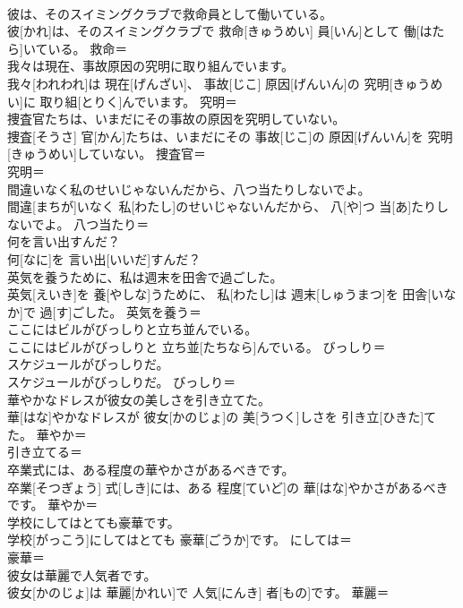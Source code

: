 \documentclass[8pt]{extreport}
\begin{document}
\begin{CJK}{UTF8}{min}
\\	彼は、そのスイミングクラブで救命員として働いている。	
\\	彼[かれ]は、そのスイミングクラブで 救命[きゅうめい] 員[いん]として 働[はたら]いている。	救命＝ 
\\	我々は現在、事故原因の究明に取り組んでいます。	
\\	我々[われわれ]は 現在[げんざい]、 事故[じこ] 原因[げんいん]の 究明[きゅうめい]に 取り組[とりく]んでいます。	究明＝ 
\\	捜査官たちは、いまだにその事故の原因を究明していない。	
\\	捜査[そうさ] 官[かん]たちは、いまだにその 事故[じこ]の 原因[げんいん]を 究明[きゅうめい]していない。	捜査官＝ 
\\	究明＝ 
\\	間違いなく私のせいじゃないんだから、八つ当たりしないでよ。	
\\	間違[まちが]いなく 私[わたし]のせいじゃないんだから、 八[や]つ 当[あ]たりしないでよ。	八つ当たり＝ 
\\	何を言い出すんだ？	
\\	何[なに]を 言い出[いいだ]すんだ？	
\\	英気を養うために、私は週末を田舎で過ごした。	
\\	英気[えいき]を 養[やしな]うために、 私[わたし]は 週末[しゅうまつ]を 田舎[いなか]で 過[す]ごした。	英気を養う＝ 
\\	ここにはビルがびっしりと立ち並んでいる。	
\\	ここにはビルがびっしりと 立ち並[たちなら]んでいる。	びっしり＝ 
\\	スケジュールがびっしりだ。	
\\	スケジュールがびっしりだ。	びっしり＝ 
\\	華やかなドレスが彼女の美しさを引き立てた。	
\\	華[はな]やかなドレスが 彼女[かのじょ]の 美[うつく]しさを 引き立[ひきた]てた。	華やか＝ 
\\	引き立てる＝ 
\\	卒業式には、ある程度の華やかさがあるべきです。	
\\	卒業[そつぎょう] 式[しき]には、ある 程度[ていど]の 華[はな]やかさがあるべきです。	華やか＝ 
\\	学校にしてはとても豪華です。	
\\	学校[がっこう]にしてはとても 豪華[ごうか]です。	にしては＝ 
\\	豪華＝ 
\\	彼女は華麗で人気者です。	
\\	彼女[かのじょ]は 華麗[かれい]で 人気[にんき] 者[もの]です。	華麗＝ 

\end{CJK}
\end{document}
